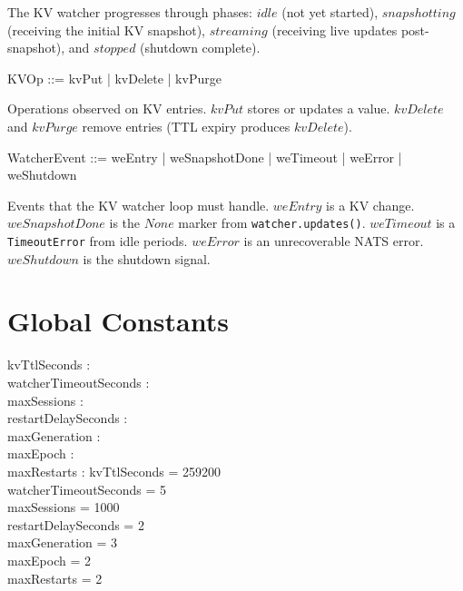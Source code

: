 \documentclass[a4paper,10pt,fleqn]{article}
\begin{document}
The KV watcher progresses through phases: $idle$ (not yet started),
$snapshotting$ (receiving the initial KV snapshot), $streaming$
(receiving live updates post-snapshot), and $stopped$ (shutdown
complete).

\begin{zed}
  KVOp ::= kvPut | kvDelete | kvPurge
\end{zed}

Operations observed on KV entries.  $kvPut$ stores or updates a
value.  $kvDelete$ and $kvPurge$ remove entries (TTL expiry
produces $kvDelete$).

\begin{zed}
  WatcherEvent ::=
  weEntry | weSnapshotDone | weTimeout | weError | weShutdown
\end{zed}

Events that the KV watcher loop must handle.  $weEntry$ is a KV
change.  $weSnapshotDone$ is the $None$ marker from
\texttt{watcher.updates()}.  $weTimeout$ is a
\texttt{TimeoutError} from idle periods.  $weError$ is an
unrecoverable NATS error.  $weShutdown$ is the shutdown signal.

\section{Global Constants}

\begin{axdef}
  kvTtlSeconds : \nat \\
  watcherTimeoutSeconds : \nat \\
  maxSessions : \nat \\
  restartDelaySeconds : \nat \\
  maxGeneration : \nat \\
  maxEpoch : \nat \\
  maxRestarts : \nat
  \where
  kvTtlSeconds = 259200 \\
  watcherTimeoutSeconds = 5 \\
  maxSessions = 1000 \\
  restartDelaySeconds = 2 \\
  maxGeneration = 3 \\
  maxEpoch = 2 \\
  maxRestarts = 2
\end{axdef}
\end{document}
